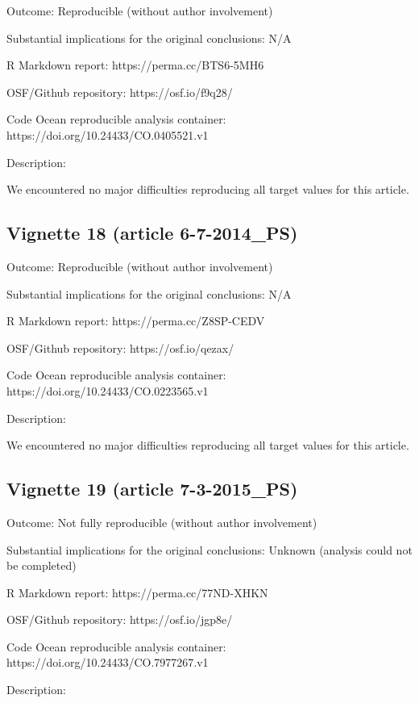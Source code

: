 \documentclass[english,,man,floatsintext]{apa6}
\begin{document}
\begin{appendix}
Outcome: Reproducible (without author involvement)

Substantial implications for the original conclusions: N/A

R Markdown report: https://perma.cc/BTS6-5MH6

OSF/Github repository: https://osf.io/f9q28/

Code Ocean reproducible analysis container:
https://doi.org/10.24433/CO.0405521.v1

Description:

We encountered no major difficulties reproducing all target values for
this article.

\hypertarget{vignette-18-article-6-7-2014_ps}{%
\subsection{Vignette 18 (article
6-7-2014\_PS)}\label{vignette-18-article-6-7-2014_ps}}

Outcome: Reproducible (without author involvement)

Substantial implications for the original conclusions: N/A

R Markdown report: https://perma.cc/Z8SP-CEDV

OSF/Github repository: https://osf.io/qezax/

Code Ocean reproducible analysis container:
https://doi.org/10.24433/CO.0223565.v1

Description:

We encountered no major difficulties reproducing all target values for
this article.

\hypertarget{vignette-19-article-7-3-2015_ps}{%
\subsection{Vignette 19 (article
7-3-2015\_PS)}\label{vignette-19-article-7-3-2015_ps}}

Outcome: Not fully reproducible (without author involvement)

Substantial implications for the original conclusions: Unknown (analysis
could not be completed)

R Markdown report: https://perma.cc/77ND-XHKN

OSF/Github repository: https://osf.io/jgp8e/

Code Ocean reproducible analysis container:
https://doi.org/10.24433/CO.7977267.v1

Description:


\end{appendix}
\end{document}
